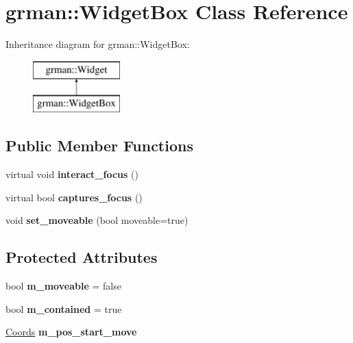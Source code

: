 \hypertarget{classgrman_1_1_widget_box}{}\section{grman\+:\+:Widget\+Box Class Reference}
\label{classgrman_1_1_widget_box}
Inheritance diagram for grman\+:\+:Widget\+Box\+:\begin{figure}[H]
\begin{center}
\leavevmode
\includegraphics[height=2.000000cm]{classgrman_1_1_widget_box}
\end{center}
\end{figure}
\subsection*{Public Member Functions}
\begin{DoxyCompactItemize}
\item 
\mbox{\label{classgrman_1_1_widget_box_a5de9d1bfbe85e470cdcc6ebb00f36b26}} 
virtual void {\bfseries interact\+\_\+focus} ()
\item 
\mbox{\label{classgrman_1_1_widget_box_a2f9311b8df4e9add38fd595e0eaf2ec9}} 
virtual bool {\bfseries captures\+\_\+focus} ()
\item 
\mbox{\label{classgrman_1_1_widget_box_a96f1aa069e1271d48e10ca91a6928ee9}} 
void {\bfseries set\+\_\+moveable} (bool moveable=true)
\end{DoxyCompactItemize}
\subsection*{Protected Attributes}
\begin{DoxyCompactItemize}
\item 
\mbox{\label{classgrman_1_1_widget_box_a5db31005a4eaa084416ff9d1a2fd738d}} 
bool {\bfseries m\+\_\+moveable} = false
\item 
\mbox{\label{classgrman_1_1_widget_box_ae8758f26d89a067827321bbd0bfb43fc}} 
bool {\bfseries m\+\_\+contained} = true
\item 
\mbox{\label{classgrman_1_1_widget_box_aed748b443a9737dc7cdef6022ae53950}} 
\mbox{\hyperlink{struct_coords}{Coords}} {\bfseries m\+\_\+pos\+\_\+start\+\_\+move}
\end{DoxyCompactItemize}


